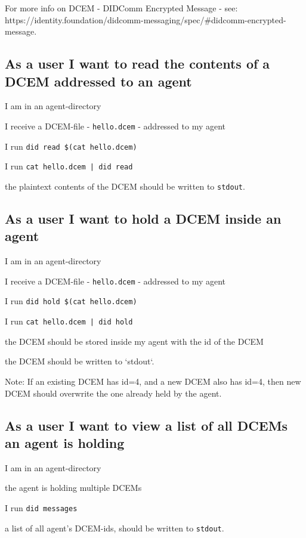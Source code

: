 For more info on DCEM - DIDComm Encrypted Message - see: https://identity.foundation/didcomm-messaging/spec/\#didcomm-encrypted-message.



\subsection{As a user I want to read the contents of a DCEM addressed to an agent}
\begin{description}[1.35cm]
    \item[Given] I am in an agent-directory
    \item[and] I receive a DCEM-file - \texttt{hello.dcem} - addressed to my agent
    \item[When] I run \texttt{did read \$(cat hello.dcem)} 
    \item[or] I run \texttt{cat hello.dcem | did read}
    \item[Then] the plaintext contents of the DCEM should be written to \texttt{stdout}.
\end{description}



\subsection{As a user I want to hold a DCEM inside an agent}
\begin{description}[1.35cm]
    \item[Given] I am in an agent-directory
    \item[and] I receive a DCEM-file - \texttt{hello.dcem} - addressed to my agent
    \item[When] I run \texttt{did hold \$(cat hello.dcem)} 
    \item[or] I run \texttt{cat hello.dcem | did hold}
    \item[Then] the DCEM should be stored inside my agent with the id of the DCEM
    \item[and] the DCEM should be written to `stdout`.
\end{description}

Note: If an existing DCEM has id=4, and a new DCEM also has id=4, then new DCEM should overwrite the one already held by the agent.



\subsection{As a user I want to view a list of all DCEMs an agent is holding}
\begin{description}[1.35cm]
    \item[Given] I am in an agent-directory
    \item[and] the agent is holding multiple DCEMs
    \item[When] I run \texttt{did messages}
    \item[Then] a list of all agent's DCEM-ids, should be written to \texttt{stdout}.
\end{description}



